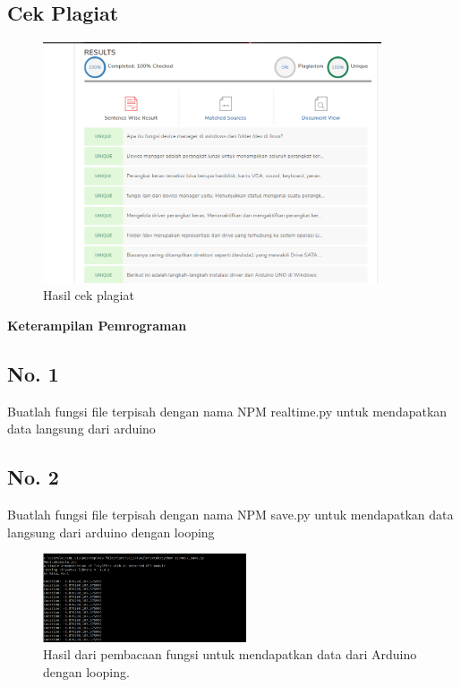 	

	\subsection{Cek Plagiat}
	\begin{figure}[H]
		\includegraphics[width=10cm]{figures/chapter5/1174057/teori/plagiarisme.png}
		\centering
		\caption{Hasil cek plagiat}
	\end{figure}
	
	
{\Large \textbf{Keterampilan Pemrograman}}
	\subsection{No. 1}
	Buatlah fungsi file terpisah dengan nama NPM realtime.py untuk mendapatkan data langsung dari arduino
	
	\hfill \break
	
	
	\subsection{No. 2}
	Buatlah fungsi file terpisah dengan nama NPM save.py untuk mendapatkan data langsung dari arduino dengan looping
	
	\hfill \break
	
	
		\begin{figure}[H]
		\includegraphics[width=6cm]{figures/chapter5/1174057/praktek/2.png}
		\centering
		\caption{Hasil dari pembacaan fungsi untuk mendapatkan data dari Arduino dengan looping.}
	\end{figure}
	
